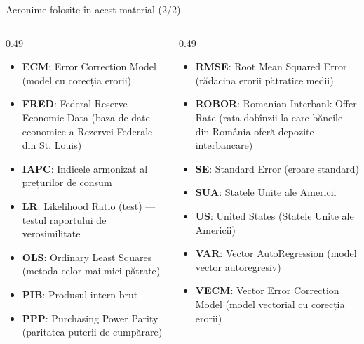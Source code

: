 \begin{frame}{Acronime folosite în acest material (2/2)}
\begin{columns}[T]
\begin{column}{0.49\textwidth}
\begin{itemize}\setlength{\itemsep}{0pt}
    \item \textbf{ECM}: Error Correction Model (model cu corecția erorii)
    \item \textbf{FRED}: Federal Reserve Economic Data (baza de date economice a Rezervei Federale din St. Louis)
    \item \textbf{IAPC}: Indicele armonizat al prețurilor de consum
    \item \textbf{LR}: Likelihood Ratio (test) — testul raportului de verosimilitate
    \item \textbf{OLS}: Ordinary Least Squares (metoda celor mai mici pătrate)
    \item \textbf{PIB}: Produsul intern brut
    \item \textbf{PPP}: Purchasing Power Parity (paritatea puterii de cumpărare)
\end{itemize}
\end{column}
\begin{column}{0.49\textwidth}
\begin{itemize}\setlength{\itemsep}{0pt}
    \item \textbf{RMSE}: Root Mean Squared Error (rădăcina erorii pătratice medii)
    \item \textbf{ROBOR}: Romanian Interbank Offer Rate (rata dobînzii la care băncile din România oferă depozite interbancare)
    \item \textbf{SE}: Standard Error (eroare standard)
    \item \textbf{SUA}: Statele Unite ale Americii
    \item \textbf{US}: United States (Statele Unite ale Americii)
    \item \textbf{VAR}: Vector AutoRegression (model vector autoregresiv)
    \item \textbf{VECM}: Vector Error Correction Model (model vectorial cu corecția erorii)
\end{itemize}
\end{column}
\end{columns}
\end{frame}

